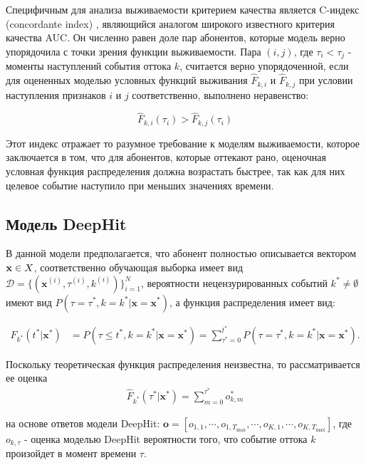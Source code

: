 \documentclass{article}
\begin{document}
Специфичным для анализа выживаемости критерием качества является C-индекс (concordante index) \cite{Alabdallah2022}, являющийся аналогом широкого известного критерия качества AUC. Он численно равен доле пар абонентов, которые модель верно упорядочила с точки зрения функции выживаемости. Пара $(i,j)$, где $\tau_i < \tau_j$ - моменты наступлений события оттока $k$, считается верно упорядоченной, если для оцененных моделью условных функций выживания $\hat{F}_{k,i}$ и $\hat{F}_{k,j}$ при условии наступления признаков $i$ и $j$ соответственно, выполнено неравенство: 

$$ \hat{F}_{k,i}(\tau_i ) >  \hat{F}_{k,j}(\tau_i ) $$ 

Этот индекс отражает то разумное требование к моделям выживаемости, которое заключается в том, что для абонентов, которые оттекают рано, оценочная условная функция распределения должна возрастать быстрее, так как для них целевое событие наступило при меньших значениях времени. 

\subsection{Модель DeepHit}

В данной модели предполагается, что абонент полностью описывается вектором $\bold{x} \in X$, соответственно обучающая выборка имеет вид $\mathcal{D}=\{(\mathbf{x}^{(i)},\tau^{(i)},k^{(i)})\}_{i=1}^N$, вероятности нецензурированных событий $k^* \neq \emptyset $ имеют вид $P(\tau=\tau^*,k=k^*|\mathbf{x}=\mathbf{x}^*)$, а функция распределения имеет вид:

\begin{align}
	F_{k^*}(t^*|\mathbf{x}^*) &= P(\tau\leq t^*,k=k^*|\mathbf{x}=\mathbf{x}^*) 
	= \sum_{\tau^*=0}^{t^*} P(\tau=\tau^*,k=k^*|\mathbf{x}=\mathbf{x}^*).
\end{align}

Поскольку теоретическая функция распределения неизвестна, то рассматривается ее оценка 
\begin{equation}
	\begin{aligned}
\hat{F}_{k^*}(\tau^*|\mathbf{x}^*)=\sum_{m=0}^{\tau^*}o_{k,m}^*
	\end{aligned}
\end{equation}

 на основе ответов модели DeepHit: $\mathbf{o}=[o_{1,1},\cdots,o_{1,T_{\max}},\cdots,o_{K,1},\cdots,o_{K,T_{\max}}]$, где $o_{k,\tau}$ - оценка моделью DeepHit вероятности того, что событие оттока $k$ произойдет в момент времени $\tau$.
\end{document}
